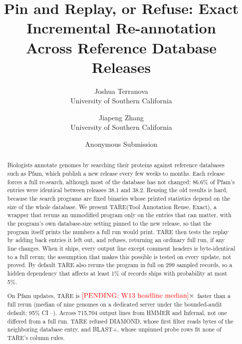 \documentclass[letterpaper,twocolumn,10pt]{article}
\author{{\rm Joshua Terranova}\\University of Southern California
    \and {\rm Jiapeng Zhang}\\University of Southern California}
\author{Anonymous Submission}
\title{Pin and Replay, or Refuse: Exact Incremental Re\nobreakdash-annotation\\
Across Reference Database Releases}
\date{}
\theoremstyle{definition}
\newcommand{\sys}{TARE\xspace}
\newcommand{\sysexpansion}{Tool Annotation Reuse, Exact}
\newcommand{\sys}{PARE\xspace}
\newcommand{\sysexpansion}{Pin And Replay Exact}
\begin{document}
\maketitle

\begin{abstract}
Biologists annotate genomes by searching their proteins against reference databases such as Pfam, which publish a
new release every few weeks to months. Each release forces a full re\nobreakdash-search, although most of the database has not
changed: 86.6\% of Pfam's entries were identical between releases 38.1 and 38.2.
Reusing the old results is hard, because the search programs are fixed binaries whose printed statistics depend on
the size of the whole database. We present \sys (\sysexpansion), a wrapper that reruns an unmodified
program only on the entries that can matter, with the program's own database\nobreakdash-size setting pinned to the new
release, so that the program itself prints the numbers a full run would print. \sys then tests the replay by adding
back entries it left out, and refuses, returning an ordinary full run, if any line changes. When it ships, every
output line except comment headers is byte\nobreakdash-identical to a full rerun; the assumption that makes this
possible is tested on every update, not proved. By default \sys also reruns the program in full on 299 sampled records,
so a hidden dependency that affects at least 1\% of records ships with probability at most 5\%.

On Pfam updates, \sys is $\textcolor{red}{\mbox{[PENDING: W13 headline median]}}\times$ faster than a full rerun (median of nine genomes on a dedicated
server under the bounded-audit default; 95\% CI \HeadlineBoundedCIlow--\HeadlineBoundedCIhigh).
Across 715{,}704 output lines from HMMER and Infernal, not one differed from a full run. \sys refused DIAMOND,
whose first filter reads bytes of the neighboring database entry, and BLAST+, whose unpinned probe rows fit none of
\sys's column rules.
\end{abstract}
\end{document}
